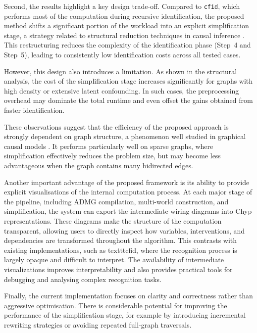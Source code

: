 \documentclass[a4paper]{report}
\begin{document}
Second, the results highlight a key design trade-off.
Compared to \texttt{cfid}, which performs most of the computation during recursive identification, the proposed method shifts a significant portion of the workload into an explicit simplification stage, a strategy related to structural reduction techniques in causal inference \cite{tian2002general, shpitser2006identification}. This restructuring reduces the complexity of the identification phase (Step~4 and Step~5), leading to consistently low identification costs across all tested cases.

However, this design also introduces a limitation. As shown in the structural analysis, the cost of the simplification stage increases significantly for graphs with high density or extensive latent confounding. In such cases, the preprocessing overhead may dominate the total runtime and even offset the gains obtained from faster identification.

These observations suggest that the efficiency of the proposed approach is strongly dependent on graph structure, a phenomenon well studied in graphical causal models \cite{spirtes2000causation}. It performs particularly well on sparse graphs, where simplification effectively reduces the problem size, but may become less advantageous when the graph contains many bidirected edges.

Another important advantage of the proposed framework is its ability to provide explicit visualisations of the internal computation process. At each major stage of the pipeline, including ADMG compilation, multi-world construction, and simplification, the system can export the intermediate wiring diagrams into Chyp representations. These diagrams make the structure of the computation transparent, allowing users to directly inspect how variables, interventions, and dependencies are transformed throughout the algorithm. This contrasts with existing implementations, such as texttt{cfid}, where the recognition process is largely opaque and difficult to interpret. The availability of intermediate visualizations improves interpretability and also provides practical tools for debugging and analysing complex recognition tasks.

Finally, the current implementation focuses on clarity and correctness rather than aggressive optimisation. There is considerable potential for improving the performance of the simplification stage, for example by introducing incremental rewriting strategies or avoiding repeated full-graph traversals.
\end{document}
